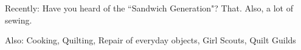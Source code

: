 
\begin{cvskills}
	\cvskill
    {Recently:}
    {Have you heard of the ``Sandwich Generation"? That.  Also, a lot of sewing.}

  \cvskill
    {Also:}
    {Cooking, Quilting, Repair of everyday objects, Girl Scouts, Quilt Guilds}

\end{cvskills}
